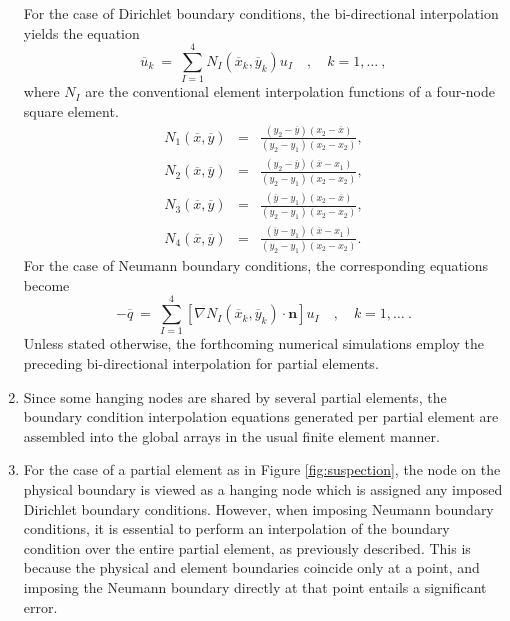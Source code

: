 \documentclass[12pt,twoside]{article}
\newcommand{\bn}{\mathbf{n}}
\begin{document}
\begin{enumerate}
For the case of Dirichlet boundary conditions, the bi-directional
interpolation yields the equation
%
\begin{equation}\label{eq:bi-Dir} 
\overline{u}_k\ =\ \sum_{I=1}^4 N_I(\overline{x}_k,\overline{y}_k)
u_I\quad,\quad k=1,\ldots\ ,
\end{equation}
%
where $N_I$ are the conventional element interpolation functions of a
four-node square element. 
\begin{eqnarray}
N_1(\overline{x},\overline{y}) &=& \frac{(y_2-\overline{y})(x_2 - \overline{x})}{(y_2 - y_1)(x_2 - x_2)},\\
N_2(\overline{x},\overline{y}) &=& \frac{(y_2-\overline{y})(\overline{x} - x_1)}{(y_2 - y_1)(x_2 - x_2)},\\
N_3(\overline{x},\overline{y}) &=& \frac{(\overline{y} - y_1)(x_2 - \overline{x})}{(y_2 - y_1)(x_2 - x_2)},\\
N_4(\overline{x},\overline{y}) &=& \frac{(\overline{y} - y_1)(\overline{x} - x_1)}{(y_2 - y_1)(x_2 - x_2)}.
\end{eqnarray}
For the case of Neumann boundary conditions, the corresponding
equations become 
%
\begin{equation}\label{eq:bi-Neu}
-\overline{q}\ =\ \sum_{I=1}^4 
\left[\nabla N_I(\overline{x}_k,\overline{y}_k)\cdot\bn\right]u_I
\quad,\quad k=1,\ldots\ .
\end{equation}
%
Unless stated otherwise, the forthcoming numerical simulations employ
the preceding bi-directional interpolation for partial elements. 
\item Since some hanging nodes are shared by several partial elements, 
the boundary condition interpolation equations generated per partial element 
are assembled into the global arrays in the usual finite element
manner. 
%
\item For the case of a partial element as in Figure \ref{fig:suspection}, 
the node on the physical boundary is viewed as a hanging node which is
assigned any imposed Dirichlet boundary conditions. However, when imposing 
Neumann boundary conditions, it is essential to perform an
interpolation of the boundary condition over the entire partial element, as
previously described. This is because the physical and element
boundaries coincide only at a point, and imposing the Neumann boundary
directly at that point entails a significant error. 
%
\end{enumerate}
\end{document}
